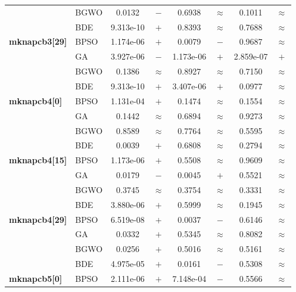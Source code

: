 \begin{table}[htbp]
\begin{tabular*}{\textwidth}{@{\extracolsep{\fill}}llcccccc@{}}
                       & BGWO  &    0.0132 & $-$ &    0.6938 & $\approx$ &    0.1011 & $\approx$ \\
                       & BDE   & 9.313e-10 & $+$ &    0.8393 & $\approx$ &    0.7688 & $\approx$ \\
    \midrule
    \textbf{mknapcb3[29]} & BPSO  & 1.174e-06 & $+$ &    0.0079 & $-$ &    0.9687 & $\approx$ \\
                       & GA    & 3.927e-06 & $-$ & 1.173e-06 & $+$ & 2.859e-07 & $+$ \\
                       & BGWO  &    0.1386 & $\approx$ &    0.8927 & $\approx$ &    0.7150 & $\approx$ \\
                       & BDE   & 9.313e-10 & $+$ & 3.407e-06 & $+$ &    0.0977 & $\approx$ \\
    \midrule
    \textbf{mknapcb4[0]} & BPSO  & 1.131e-04 & $+$ &    0.1474 & $\approx$ &    0.1554 & $\approx$ \\
                       & GA    &    0.1442 & $\approx$ &    0.6894 & $\approx$ &    0.9273 & $\approx$ \\
                       & BGWO  &    0.8589 & $\approx$ &    0.7764 & $\approx$ &    0.5595 & $\approx$ \\
                       & BDE   &    0.0039 & $+$ &    0.6808 & $\approx$ &    0.2794 & $\approx$ \\
    \midrule
    \textbf{mknapcb4[15]} & BPSO  & 1.173e-06 & $+$ &    0.5508 & $\approx$ &    0.9609 & $\approx$ \\
                       & GA    &    0.0179 & $-$ &    0.0045 & $+$ &    0.5521 & $\approx$ \\
                       & BGWO  &    0.3745 & $\approx$ &    0.3754 & $\approx$ &    0.3331 & $\approx$ \\
                       & BDE   & 3.880e-06 & $+$ &    0.5999 & $\approx$ &    0.1945 & $\approx$ \\
    \midrule
    \textbf{mknapcb4[29]} & BPSO  & 6.519e-08 & $+$ &    0.0037 & $-$ &    0.6146 & $\approx$ \\
                       & GA    &    0.0332 & $+$ &    0.5345 & $\approx$ &    0.8082 & $\approx$ \\
                       & BGWO  &    0.0256 & $+$ &    0.5016 & $\approx$ &    0.5161 & $\approx$ \\
                       & BDE   & 4.975e-05 & $+$ &    0.0161 & $-$ &    0.5308 & $\approx$ \\
    \midrule
    \textbf{mknapcb5[0]} & BPSO  & 2.111e-06 & $+$ & 7.148e-04 & $-$ &    0.5566 & $\approx$ \\

\end{tabular*}
\end{table}
